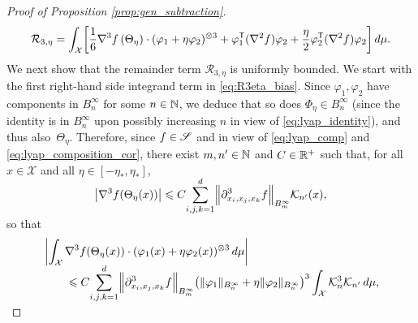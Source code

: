 \begin{proof}[Proof of Proposition \ref{prop:gen_subtraction}]
\begin{equation}
	\mathcal{R}_{3,\eta} = \int_\mathcal{X} \bkt*{\frac{1}{6}\nabla^3f\left(\Theta_\eta\right)\cdot (\varphi_1 + \eta\varphi_2)^{\otimes 3} + \varphi_1^\t (\nabla^2 f)\varphi_2 + \frac{\eta}{2}\varphi_2^\t (\nabla^2 f)\varphi_2} \, d\mu.
	\label{eq:R3eta_bias}
\end{equation}
%
We next show that the remainder term $\mathcal{R}_{3,\eta}$ is uniformly bounded. We start with the first right-hand side integrand term in \eqref{eq:R3eta_bias}. Since $\varphi_1,\varphi_2$ have components in $B^\infty_n$ for some $n\in\N$, we deduce that so does $\Phi_\eta\in B^\infty_n$ (since the identity is in $B^\infty_n$ upon possibly increasing $n$ in view of \eqref{eq:lyap_identity}), and thus also~$\Theta_\eta$. Therefore, since $f\in\S$ and in view of \eqref{eq:lyap_comp} and \eqref{eq:lyap_composition_cor}, there exist $m,n'\in\N$ and $C\in\R^+$ such that, for all~$x\in\mathcal{X}$ and all $\eta\in [-\eta_*,\eta_*]$,
%
\begin{align}
	\abs*{\nabla^3f\paren*{\Theta_\eta(x)}} %
	\leq C\smash{\sum_{i,j,k=1}^d}\norm*{\partial_{x_i,x_j,x_k}^3 f}_{B_m^\infty}\mathcal{K}_{n'}(x),
\end{align}
%
so that 
%
\begin{align}
	&\left|\int_\mathcal{X} \nabla^3f\paren*{\Theta_\eta(x)}\cdot (\varphi_1(x) + \eta\varphi_2(x))^{\otimes 3} \, d\mu\right| \label{eq:R3theta_err} \\
	\label{eq:rem_bounded}
	&\qquad \leq C\smash{\sum_{i,j,k=1}^d}\norm*{\partial_{x_i,x_j,x_k}^3 f}_{B_m^\infty}\paren*{\norm{\varphi_1}_{B_n^\infty} + \eta\norm{\varphi_2}_{B_n^\infty}}^3\int_\mathcal{X} \mathcal{K}_n^3\mathcal{K}_{n'} \, d\mu,

\end{align}
\end{proof}
